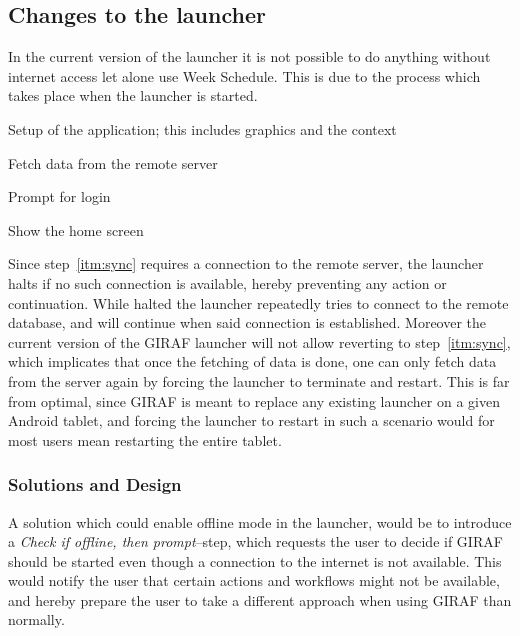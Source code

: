 \subsection{Changes to the launcher}
\label{sub:changes_to_the_launcher}
In the current version of the launcher it is not possible to do anything without internet access let alone use Week Schedule.
This is due to the process which takes place when the launcher is started.
\begin{enumberate}
    \item Setup of the application; this includes graphics and the context
    \item\label{itm:sync} Fetch data from the remote server
    \item Prompt for login
    \item Show the home screen
\end{enumberate}
Since step~\ref{itm:sync} requires a connection to the remote server, the launcher halts if no such connection is available, hereby preventing any action or continuation.
While halted the launcher repeatedly tries to connect to the remote database, and will continue when said connection is established.
Moreover the current version of the GIRAF launcher will not allow reverting to step~\ref{itm:sync}, which implicates that once the fetching of data is done, one can only fetch data from the server again by forcing the launcher to terminate and restart.
This is far from optimal, since GIRAF is meant to replace any existing launcher on a given Android tablet, and forcing the launcher to restart in such a scenario would for most users mean restarting the entire tablet.

\subsubsection{Solutions and Design}
A solution which could enable offline mode in the launcher, would be to introduce a \textit{Check if offline, then prompt}--step, which requests the user to decide if GIRAF should be started even though a connection to the internet is not available.
This would notify the user that certain actions and workflows might not be available, and hereby prepare the user to take a different approach when using GIRAF than normally.

